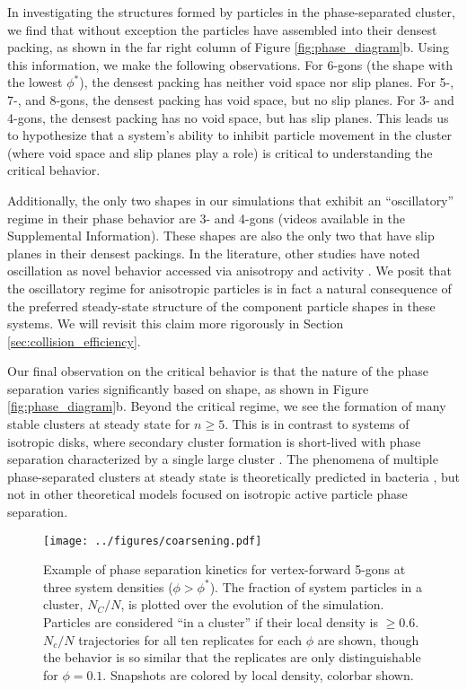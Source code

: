 In investigating the structures formed by particles in the phase-separated cluster, we find that without exception the particles have assembled into their densest packing, as shown in the far right column of Figure \ref{fig:phase_diagram}b.
Using this information, we make the following observations.
For 6-gons (the shape with the lowest $\phi^*$), the densest packing has neither void space nor slip planes.
For 5-, 7-, and 8-gons, the densest packing has void space, but no slip planes.
For 3- and 4-gons, the densest packing has no void space, but has slip planes.
This leads us to hypothesize that a system's ability to inhibit particle movement in the cluster (where void space and slip planes play a role) is critical to understanding the critical behavior.

Additionally, the only two shapes in our simulations that exhibit an ``oscillatory'' regime in their phase behavior are 3- and 4-gons (videos available in the Supplemental Information).
These shapes are also the only two that have slip planes in their densest packings.
In the literature, other studies have noted oscillation as novel behavior accessed via anisotropy and activity \cite{Prymidis_2016_SoftMatter, Feng_2019_SoftMatter}.
We posit that the oscillatory regime for anisotropic particles is in fact a natural consequence of the preferred steady-state structure of the component particle shapes in these systems.
We will revisit this claim more rigorously in Section \ref{sec:collision_efficiency}.

Our final observation on the critical behavior is that the nature of the phase separation varies significantly based on shape, as shown in Figure \ref{fig:phase_diagram}b.
Beyond the critical regime, we see the formation of many stable clusters at steady state for $n{\geq}5$.
This is in contrast to systems of isotropic disks, where secondary cluster formation is short-lived with phase separation characterized by a single large cluster \cite{Redner_2013_PRE, Redner_2013_PRL}.
The phenomena of multiple phase-separated clusters at steady state is theoretically predicted in bacteria \cite{Cates_2010_PNAS}, but not in other theoretical models focused on isotropic active particle phase separation\cite{Fily_2012_PRL,Redner_2016_PRL}.

\begin{figure}[t]
\begin{center}
\texttt{[image: ../figures/coarsening.pdf]}
\caption{
Example of phase separation kinetics for vertex-forward 5-gons at three system densities ($\phi>\phi^*$).
The fraction of system particles in a cluster, $N_C/N$, is plotted over the evolution of the simulation.
Particles are considered ``in a cluster'' if their local density is $\geq0.6$.
$N_c/N$ trajectories for all ten replicates for each $\phi$ are shown, though the behavior is so similar that the replicates are only distinguishable for $\phi=0.1$.
Snapshots are colored by local density, colorbar shown.
}
\label{fig:coarsening}
\end{center}
\end{figure}

